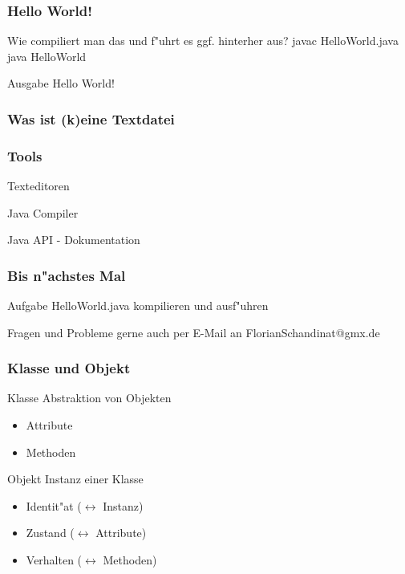 \documentclass{beamer}
\begin{document}
\begin{frame}
\frametitle{Hello World!}

\pause
\begin{block}{Wie compiliert man das und f"uhrt es ggf. hinterher aus?}
\pause
javac HelloWorld.java\pause\\
java HelloWorld
\end{block}
\pause
\begin{block}{Ausgabe}
Hello World!
\end{block}
\end{frame}


\begin{frame}
\frametitle{Was ist (k)eine Textdatei}
\end{frame}

\begin{frame}
\frametitle{Tools}
\begin{block}{Texteditoren}
\end{block}

\begin{block}{Java Compiler}
\end{block}

\begin{block}{Java API - Dokumentation}

\end{block}
\end{frame}


\begin{frame}
\frametitle{Bis n"achstes Mal}
\begin{block}{Aufgabe}
HelloWorld.java kompilieren und ausf"uhren
\end{block}

\begin{block}{Fragen und Probleme}
gerne auch per E-Mail an FlorianSchandinat@gmx.de
\end{block}
\end{frame}


\begin{frame}
\frametitle{Klasse und Objekt}
\pause
\begin{block}{Klasse}
Abstraktion von Objekten\\
\pause
\begin{itemize}
\item Attribute
\item Methoden
\end{itemize}
\end{block}

\pause

\begin{block}{Objekt}
Instanz einer Klasse\\
\pause
\begin{itemize}
\item Identit"at ($\leftrightarrow$ Instanz)
\item Zustand ($\leftrightarrow$ Attribute)
\item Verhalten ($\leftrightarrow$ Methoden)
\end{itemize}
\end{block}
\end{frame}
\end{document}
